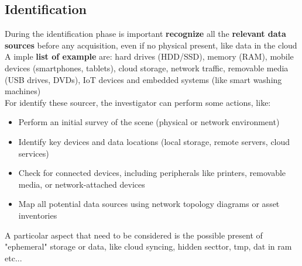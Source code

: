 \subsection{Identification}
During the identification phase is important \textbf{recognize} all the \textbf{relevant data sources} before any acquisition, even if no physical present, like data in the cloud \\ A imple \textbf{list of example} are: hard drives (HDD/SSD), memory (RAM), mobile devices (smartphones, tablets), cloud storage, network traffic, removable media (USB drives, DVDs), IoT devices and embedded systems (like smart washing machines) \\ 
\bigskip For identify these sourcer, the investigator can perform some actions, like:
\begin{itemize}[itemsep=0pt]

    \item Perform an initial survey of the scene (physical or network environment)
    
    \item Identify key devices and data locations (local storage, remote servers, cloud services)
    
    \item Check for connected devices, including peripherals like printers, removable media, or network-attached devices
    
    \item Map all potential data sources using network topology diagrams or asset inventories
    
\end{itemize}

A particolar aspect that need to be considered is the possible present of "ephemeral" storage or data, like cloud syncing, hidden secttor, tmp, dat in ram etc...

